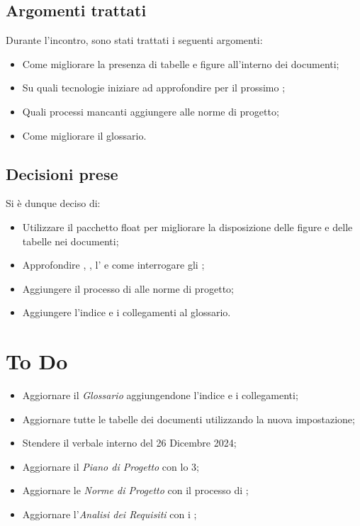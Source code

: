\documentclass[a4paper, 12pt]{article}
\begin{document}
\subsection{Argomenti trattati}
Durante l'incontro, sono stati trattati i seguenti argomenti:
\begin{itemize}
    \item Come migliorare la presenza di tabelle e figure all'interno dei documenti;
    \item Su quali tecnologie iniziare ad approfondire per il prossimo ;
    \item Quali processi mancanti aggiungere alle norme di progetto;
    \item Come migliorare il glossario.
\end{itemize}
\subsection{Decisioni prese}
Si è dunque deciso di:
\begin{itemize}
    \item Utilizzare il pacchetto float per migliorare la disposizione delle figure e delle tabelle nei documenti;
    \item Approfondire , , l' e come interrogare gli ;
    \item Aggiungere il processo di  alle norme di progetto;
    \item Aggiungere l'indice e i collegamenti al glossario.
\end{itemize}
\section{To Do}
\begin{itemize}
    \item Aggiornare il \textit{Glossario} aggiungendone l'indice e i collegamenti;
    \item Aggiornare tutte le tabelle dei documenti utilizzando la nuova impostazione;
    \item Stendere il verbale interno del 26 Dicembre 2024;
    \item Aggiornare il \textit{Piano di Progetto} con lo  3;
    \item Aggiornare le \textit{Norme di Progetto} con il processo di ;
    \item Aggiornare l'\textit{Analisi dei Requisiti} con i ;
\end{itemize}
\end{document}
